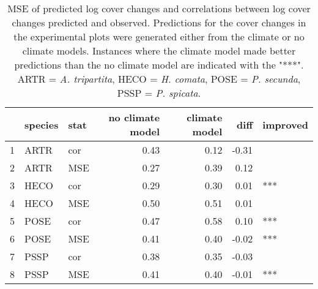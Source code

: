 \begin{table}[H]
\centering
\caption{MSE of predicted log cover changes and correlations between log cover changes predicted and observed. Predictions for the cover changes in the experimental plots were generated either from the climate or no climate models. Instances where the climate model made better predictions than the no climate model are indicated with the "***". ARTR = \textit{A. tripartita}, HECO = \textit{H. comata}, POSE = \textit{P. secunda}, PSSP = \textit{P. spicata}.} 
\label{table:corPGR}
\begin{tabular}{rllrrrl}
  \hline
 & species & stat & no climate model & climate model & diff & improved \\ 
  \hline
1 & ARTR & cor & 0.43 & 0.12 & -0.31 &  \\ 
  2 & ARTR & MSE & 0.27 & 0.39 & 0.12 &  \\ 
  3 & HECO & cor & 0.29 & 0.30 & 0.01 & *** \\ 
  4 & HECO & MSE & 0.50 & 0.51 & 0.01 &  \\ 
  5 & POSE & cor & 0.47 & 0.58 & 0.10 & *** \\ 
  6 & POSE & MSE & 0.41 & 0.40 & -0.02 & *** \\ 
  7 & PSSP & cor & 0.38 & 0.35 & -0.03 &  \\ 
  8 & PSSP & MSE & 0.41 & 0.40 & -0.01 & *** \\ 
   \hline
\end{tabular}
\end{table}
